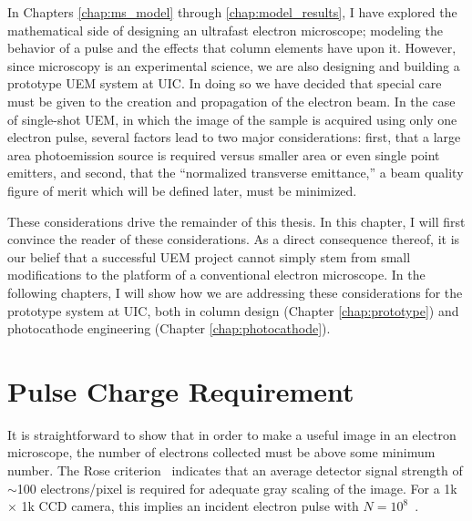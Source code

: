 
In Chapters \ref{chap:ms_model} through \ref{chap:model_results}, I have explored the mathematical side of designing an ultrafast electron microscope; modeling the behavior of a pulse and the effects that column elements have upon it.
However, since microscopy is an experimental science, we are also designing and building a prototype UEM system at UIC.
In doing so we have decided that special care must be given to the creation and propagation of the electron beam.
In the case of single-shot UEM, in which the image of the sample is acquired using only one electron pulse, several factors lead to two major considerations: first, that a large area photoemission source is required versus smaller area or even single point emitters, and second, that the ``normalized transverse emittance,'' a beam quality figure of merit which will be defined later, must be minimized.

These considerations drive the remainder of this thesis.
In this chapter, I will first convince the reader of these considerations.
As a direct consequence thereof, it is our belief that a successful UEM project cannot simply stem from small modifications to the platform of a conventional electron microscope.
In the following chapters, I will show how we are addressing these considerations for the prototype system at UIC, both in column design (Chapter \ref{chap:prototype}) and photocathode engineering (Chapter \ref{chap:photocathode}).

\section{Pulse Charge Requirement}

It is straightforward to show that in order to make a useful image in an electron microscope, the number of electrons collected must be above some minimum number.
The Rose criterion~\cite{rose_television_1948} indicates that an average detector signal strength of $\sim$100 electrons/pixel is required for adequate gray scaling of the image.
For a 1k $\times$ 1k CCD camera, this implies an incident electron pulse with $N=10^8$~\cite{armstrong_prospects_2007}.

